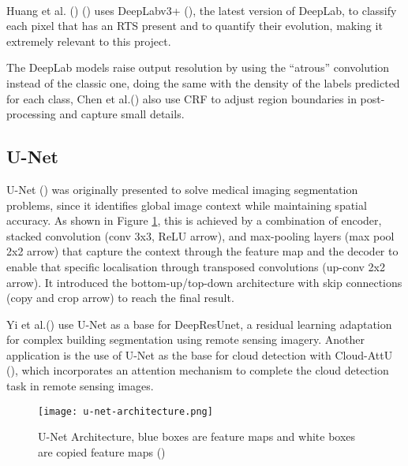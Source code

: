 \paragraph{}
Huang et al. (\cite{HUANG2020111534}) (\cite{HUANG2021102399}) uses DeepLabv3+ (\cite{Chen_2018_ECCV}), the latest version of DeepLab, to classify each pixel that has an \gls{RTS} present and to quantify their evolution, making it extremely relevant to this project.

The DeepLab models raise output resolution by using the “atrous” convolution instead of the classic one, doing the same with the density of the labels predicted for each class, Chen et al.(\cite{chen2016semantic}) also use \gls{CRF} to adjust region boundaries in post-processing and capture small details.

\subsection{U-Net}
U-Net (\cite{ronneberger2015unet}) was originally presented to solve medical imaging segmentation problems, since it identifies global image context while maintaining spatial accuracy. As shown in Figure \ref{fig_unet}, this is achieved by a combination of encoder, stacked convolution (conv 3x3, \gls{ReLU} arrow), and max-pooling layers (max pool 2x2 arrow) that capture the context through the feature map and the decoder to enable that specific localisation through transposed convolutions (up-conv 2x2 arrow). It introduced the bottom-up/top-down architecture with skip connections (copy and crop arrow) to reach the final result.

Yi et al.(\cite{rs11151774}) use U-Net as a base for DeepResUnet, a residual learning adaptation for complex building segmentation using remote sensing imagery. Another application is the use of U-Net as the base for cloud detection with Cloud-AttU (\cite{sym12061056}), which incorporates an attention mechanism to complete the cloud detection task in remote sensing images.

    \begin{figure}[hbt!]
        \centering
        \texttt{[image: u-net-architecture.png]}
        \caption{U-Net Architecture, blue boxes are feature maps and white boxes are copied feature maps (\cite{ronneberger2015unet})}
        \label{fig_unet}
    \end{figure}